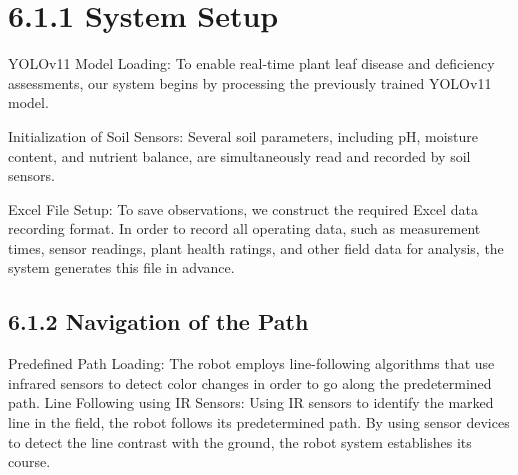 \documentclass{book} %
\begin{document}
\noindent 
\section{}

\noindent 
\section{}

\noindent 
\section{}

\noindent 
\section{}

\noindent 
\section{}

\noindent 
\section{6.1.1 System Setup}

\noindent YOLOv11 Model Loading: To enable real-time plant leaf disease and deficiency assessments, our system begins by processing the previously trained YOLOv11 model.

\noindent Initialization of Soil Sensors: Several soil parameters, including pH, moisture content, and nutrient balance, are simultaneously read and recorded by soil sensors.

\noindent Excel File Setup: To save observations, we construct the required Excel data recording format. In order to record all operating data, such as measurement times, sensor readings, plant health ratings, and other field data for analysis, the system generates this file in advance.

\noindent 

\noindent 
\subsection{6.1.2 Navigation of the Path}

\noindent Predefined Path Loading: The robot employs line-following algorithms that use infrared sensors to detect color changes in order to go along the predetermined path. Line Following using IR Sensors: Using IR sensors to identify the marked line in the field, the robot follows its predetermined path. By using sensor devices to detect the line contrast with the ground, the robot system establishes its course.
\end{document}

